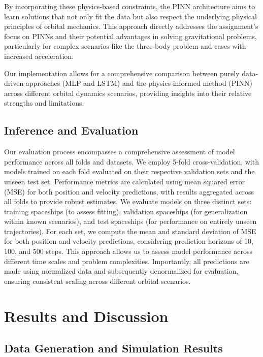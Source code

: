 \documentclass[12pt,a4paper]{article}
\begin{document}
By incorporating these physics-based constraints, the PINN architecture aims to learn solutions that not only fit the data but also respect the underlying physical principles of orbital mechanics. This approach directly addresses the assignment's focus on PINNs and their potential advantages in solving gravitational problems, particularly for complex scenarios like the three-body problem and cases with increased acceleration.

Our implementation allows for a comprehensive comparison between purely data-driven approaches (MLP and LSTM) and the physics-informed method (PINN) across different orbital dynamics scenarios, providing insights into their relative strengths and limitations.

\subsection{Inference and Evaluation}

Our evaluation process encompasses a comprehensive assessment of model performance across all folds and datasets. We employ 5-fold cross-validation, with models trained on each fold evaluated on their respective validation sets and the unseen test set. Performance metrics are calculated using mean squared error (MSE) for both position and velocity predictions, with results aggregated across all folds to provide robust estimates. We evaluate models on three distinct sets: training spaceships (to assess fitting), validation spaceships (for generalization within known scenarios), and test spaceships (for performance on entirely unseen trajectories). For each set, we compute the mean and standard deviation of MSE for both position and velocity predictions, considering prediction horizons of 10, 100, and 500 steps. This approach allows us to assess model performance across different time scales and problem complexities. Importantly, all predictions are made using normalized data and subsequently denormalized for evaluation, ensuring consistent scaling across different orbital scenarios.

\section{Results and Discussion}
\label{sec:results}

\subsection{Data Generation and Simulation Results}
\end{document}
